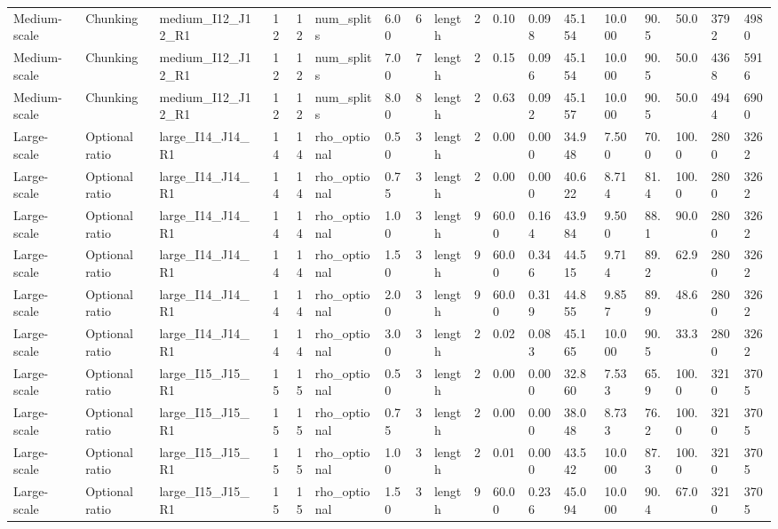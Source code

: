 \begin{longtable}{lllrrllllrllllllll}
Medium-scale & Chunking & medium\_I12\_J12\_R1 & 12 & 12 & num\_splits & 6.00 & 6 & length & 2 & 0.10 & 0.098 & 45.154 & 10.000 & 90.5 & 50.0 & 3792 & 4980 \\
Medium-scale & Chunking & medium\_I12\_J12\_R1 & 12 & 12 & num\_splits & 7.00 & 7 & length & 2 & 0.15 & 0.096 & 45.154 & 10.000 & 90.5 & 50.0 & 4368 & 5916 \\
Medium-scale & Chunking & medium\_I12\_J12\_R1 & 12 & 12 & num\_splits & 8.00 & 8 & length & 2 & 0.63 & 0.092 & 45.157 & 10.000 & 90.5 & 50.0 & 4944 & 6900 \\
Large-scale & Optional ratio & large\_I14\_J14\_R1 & 14 & 14 & rho\_optional & 0.50 & 3 & length & 2 & 0.00 & 0.000 & 34.948 & 7.500 & 70.0 & 100.0 & 2800 & 3262 \\
Large-scale & Optional ratio & large\_I14\_J14\_R1 & 14 & 14 & rho\_optional & 0.75 & 3 & length & 2 & 0.00 & 0.000 & 40.622 & 8.714 & 81.4 & 100.0 & 2800 & 3262 \\
Large-scale & Optional ratio & large\_I14\_J14\_R1 & 14 & 14 & rho\_optional & 1.00 & 3 & length & 9 & 60.00 & 0.164 & 43.984 & 9.500 & 88.1 & 90.0 & 2800 & 3262 \\
Large-scale & Optional ratio & large\_I14\_J14\_R1 & 14 & 14 & rho\_optional & 1.50 & 3 & length & 9 & 60.00 & 0.346 & 44.515 & 9.714 & 89.2 & 62.9 & 2800 & 3262 \\
Large-scale & Optional ratio & large\_I14\_J14\_R1 & 14 & 14 & rho\_optional & 2.00 & 3 & length & 9 & 60.00 & 0.319 & 44.855 & 9.857 & 89.9 & 48.6 & 2800 & 3262 \\
Large-scale & Optional ratio & large\_I14\_J14\_R1 & 14 & 14 & rho\_optional & 3.00 & 3 & length & 2 & 0.02 & 0.083 & 45.165 & 10.000 & 90.5 & 33.3 & 2800 & 3262 \\
Large-scale & Optional ratio & large\_I15\_J15\_R1 & 15 & 15 & rho\_optional & 0.50 & 3 & length & 2 & 0.00 & 0.000 & 32.860 & 7.533 & 65.9 & 100.0 & 3210 & 3705 \\
Large-scale & Optional ratio & large\_I15\_J15\_R1 & 15 & 15 & rho\_optional & 0.75 & 3 & length & 2 & 0.00 & 0.000 & 38.048 & 8.733 & 76.2 & 100.0 & 3210 & 3705 \\
Large-scale & Optional ratio & large\_I15\_J15\_R1 & 15 & 15 & rho\_optional & 1.00 & 3 & length & 2 & 0.01 & 0.000 & 43.542 & 10.000 & 87.3 & 100.0 & 3210 & 3705 \\
Large-scale & Optional ratio & large\_I15\_J15\_R1 & 15 & 15 & rho\_optional & 1.50 & 3 & length & 9 & 60.00 & 0.236 & 45.094 & 10.000 & 90.4 & 67.0 & 3210 & 3705 \\

\end{longtable}
